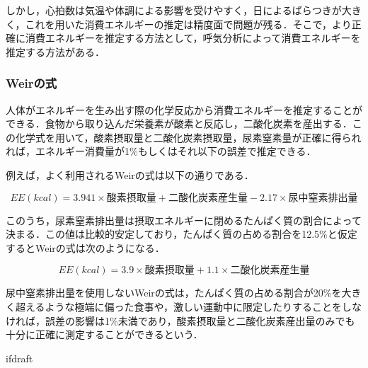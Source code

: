 しかし，心拍数は気温や体調による影響を受けやすく，日によるばらつきが大きく，これを用いた消費エネルギーの推定は精度面で問題が残る．そこで，より正確に消費エネルギーを推定する方法として，呼気分析によって消費エネルギーを推定する方法がある．

\subsubsection{Weirの式}

人体がエネルギーを生み出す際の化学反応から消費エネルギーを推定することができる．食物から取り込んだ栄養素が酸素と反応し，二酸化炭素を産出する．この化学式を用いて，酸素摂取量と二酸化炭素摂取量，尿素窒素量が正確に得られれば，エネルギー消費量が1\%もしくはそれ以下の誤差で推定できる\cite{livesey_1988}．

例えば，よく利用されるWeir\cite{weir_1949}の式は以下の通りである．

\begin{equation}
  \label{weir_urea_formula}
  EE(kcal) = 3.941 \times 酸素摂取量 + 二酸化炭素産生量 - 2.17 \times 尿中窒素排出量
\end{equation}

このうち，尿素窒素排出量は摂取エネルギーに閉めるたんぱく質の割合によって決まる．この値は比較的安定しており，たんぱく質の占める割合を12.5\%と仮定するとWeirの式は次のようになる．

\begin{equation}
  \label{weir_formula}
  EE(kcal) = 3.9 \times 酸素摂取量 + 1.1 \times 二酸化炭素産生量
\end{equation}

尿中窒素排出量を使用しないWeirの式は，たんぱく質の占める割合が20\%を大きく超えるような極端に偏った食事や，激しい運動中に限定したりすることをしなければ，誤差の影響は1\%未満であり，酸素摂取量と二酸化炭素産出量のみでも十分に正確に測定することができるという\cite{tanaka_2006}．

\expandafter\ifx\csname ifdraft\endcsname\relax
  
\fi
